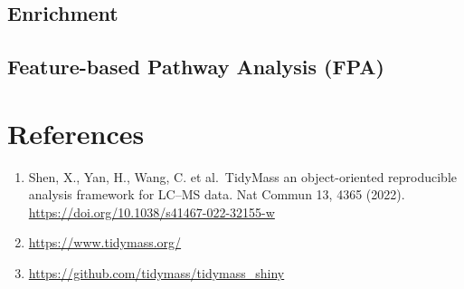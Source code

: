 \documentclass[
]{book}
\providecommand{\tightlist}{%
  \setlength{\itemsep}{0pt}\setlength{\parskip}{0pt}}
\begin{document}
\section{Enrichment}\label{enrichment}

\section{Feature-based Pathway Analysis (FPA)}\label{feature-based-pathway-analysis-fpa}

\chapter{References}\label{references}

\begin{enumerate}
\def\labelenumi{\arabic{enumi}.}
\tightlist
\item
  Shen, X., Yan, H., Wang, C. et al.~TidyMass an object-oriented reproducible analysis framework for LC--MS data. Nat Commun 13, 4365 (2022). \url{https://doi.org/10.1038/s41467-022-32155-w}
\item
  \url{https://www.tidymass.org/}
\item
  \url{https://github.com/tidymass/tidymass_shiny}
\end{enumerate}

  
\end{document}
